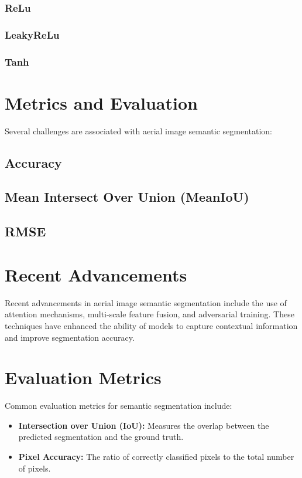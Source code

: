 \documentclass[conference]{IEEEtran}
\begin{document}
\subsubsection{ReLu}
\subsubsection{LeakyReLu}
\subsubsection{Tanh}



\section{Metrics and Evaluation}
Several challenges are associated with aerial image semantic segmentation:
\subsection{Accuracy}
\subsection{Mean Intersect Over Union (MeanIoU)}
\subsection{RMSE}

\section{Recent Advancements}
Recent advancements in aerial image semantic segmentation include the use of attention mechanisms, multi-scale feature fusion, and adversarial training. These techniques have enhanced the ability of models to capture contextual information and improve segmentation accuracy.

\section{Evaluation Metrics}
Common evaluation metrics for semantic segmentation include:
\begin{itemize}
    \item \textbf{Intersection over Union (IoU):} Measures the overlap between the predicted segmentation and the ground truth.
    \item \textbf{Pixel Accuracy:} The ratio of correctly classified pixels to the total number of pixels.
\end{itemize}
\end{document}
